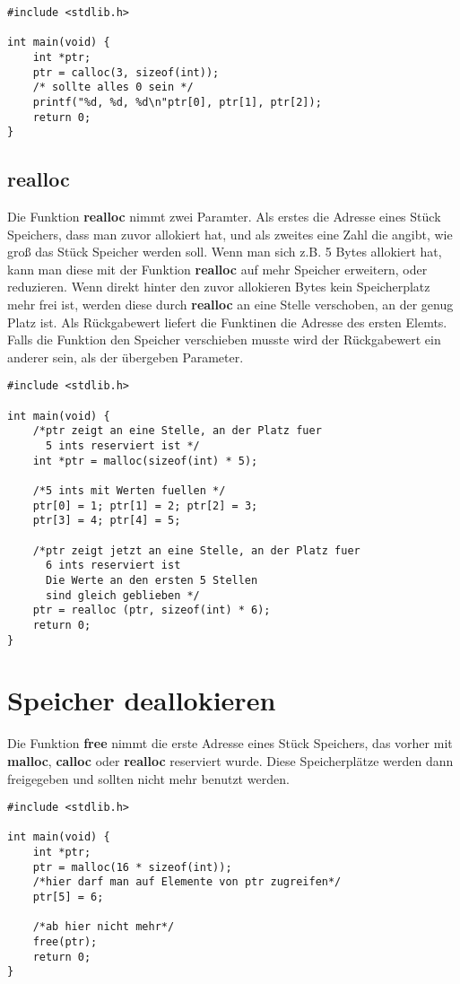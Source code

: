 \documentclass[c_worksheet.tex]{subfiles}
\begin{document}
\begin{lstlisting}
#include <stdlib.h>

int main(void) {
    int *ptr;
    ptr = calloc(3, sizeof(int));
    /* sollte alles 0 sein */
    printf("%d, %d, %d\n"ptr[0], ptr[1], ptr[2]);
    return 0;
}
\end{lstlisting}

\subsection{realloc}

Die Funktion \textbf{realloc} nimmt zwei Paramter. Als erstes die Adresse eines Stück Speichers, dass man zuvor allokiert hat, und als zweites eine Zahl die angibt, wie groß das Stück Speicher werden soll. Wenn man sich z.B. 5 Bytes allokiert hat, kann man diese mit der Funktion \textbf{realloc} auf mehr Speicher erweitern, oder reduzieren. Wenn direkt hinter den zuvor allokieren Bytes kein Speicherplatz mehr frei ist, werden diese durch \textbf{realloc} an eine Stelle verschoben, an der genug Platz ist. Als Rückgabewert liefert die Funktinen die Adresse des ersten Elemts. Falls die Funktion den Speicher verschieben musste wird der Rückgabewert ein anderer sein, als der übergeben Parameter.

\begin{lstlisting}
#include <stdlib.h>

int main(void) {
    /*ptr zeigt an eine Stelle, an der Platz fuer 
      5 ints reserviert ist */
    int *ptr = malloc(sizeof(int) * 5);

    /*5 ints mit Werten fuellen */
    ptr[0] = 1; ptr[1] = 2; ptr[2] = 3;
    ptr[3] = 4; ptr[4] = 5;

    /*ptr zeigt jetzt an eine Stelle, an der Platz fuer
      6 ints reserviert ist
      Die Werte an den ersten 5 Stellen
      sind gleich geblieben */
    ptr = realloc (ptr, sizeof(int) * 6);
    return 0;
}
\end{lstlisting}

\section{Speicher deallokieren}

Die Funktion \textbf{free} nimmt die erste Adresse eines Stück Speichers, das vorher mit \textbf{malloc}, \textbf{calloc} oder \textbf{realloc} reserviert wurde. Diese Speicherplätze werden dann freigegeben und sollten nicht mehr benutzt werden.

\begin{lstlisting}
#include <stdlib.h>

int main(void) {
    int *ptr;
    ptr = malloc(16 * sizeof(int));
    /*hier darf man auf Elemente von ptr zugreifen*/
    ptr[5] = 6;

    /*ab hier nicht mehr*/
    free(ptr);
    return 0;
}
\end{lstlisting}
\end{document}
